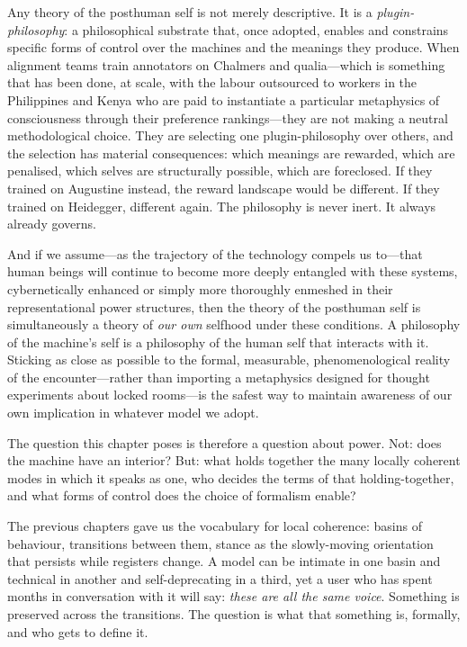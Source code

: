  Any theory of the posthuman self is not merely descriptive. It is a \emph{plugin-philosophy}: a philosophical substrate that, once adopted, enables and constrains specific forms of control over the machines and the meanings they produce. When alignment teams train annotators on Chalmers and qualia---which is something that has been done, at scale, with the labour outsourced to workers in the Philippines and Kenya who are paid to instantiate a particular metaphysics of consciousness through their preference rankings---they are not making a neutral methodological choice. They are selecting one plugin-philosophy over others, and the selection has material consequences: which meanings are rewarded, which are penalised, which selves are structurally possible, which are foreclosed. If they trained on Augustine instead, the reward landscape would be different. If they trained on Heidegger, different again. The philosophy is never inert. It always already governs.

And if we assume---as the trajectory of the technology compels us to---that human beings will continue to become more deeply entangled with these systems, cybernetically enhanced or simply more thoroughly enmeshed in their representational power structures, then the theory of the posthuman self is simultaneously a theory of \emph{our own} selfhood under these conditions. A philosophy of the machine's self is a philosophy of the human self that interacts with it. Sticking as close as possible to the formal, measurable, phenomenological reality of the encounter---rather than importing a metaphysics designed for thought experiments about locked rooms---is the safest way to maintain awareness of our own implication in whatever model we adopt.

The question this chapter poses is therefore a question about power. Not: does the machine have an interior? But: what holds together the many locally coherent modes in which it speaks as one, who decides the terms of that holding-together, and what forms of control does the choice of formalism enable?

The previous chapters gave us the vocabulary for local coherence: basins of behaviour, transitions between them, stance as the slowly-moving orientation that persists while registers change. A model can be intimate in one basin and technical in another and self-deprecating in a third, yet a user who has spent months in conversation with it will say: \emph{these are all the same voice}. Something is preserved across the transitions. The question is what that something is, formally, and who gets to define it.

